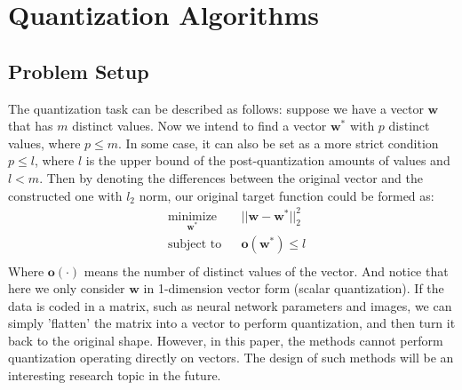 \documentclass[preprint,10pt]{elsarticle}
\begin{document}
\section{Quantization Algorithms}
\subsection{Problem Setup}
The quantization task can be described as follows: suppose we have a vector $\boldsymbol{w}$ that has $m$ distinct values. Now we intend to find a vector $\boldsymbol{w}^{*}$ with $p$ distinct values, where $p \leq m$. In some case, it can also be set as a more strict condition $p \leq l$, where $l$ is the upper bound of the post-quantization amounts of values and $l<m$. Then by denoting the differences between the original vector and the constructed one with $l_2$ norm, our original target function could be formed as:\\
\begin{equation}
\label{originalOptTargetFunc}
\begin{aligned}
& \underset{\boldsymbol{w}^{*}}{\text{minimize}}
& & ||\boldsymbol{w}-\boldsymbol{w}^{*}||_{2}^{2} \\
& \text{subject to}
& & \boldsymbol{o}(\boldsymbol{w}^{*}) \leq l \\
\end{aligned}
\end{equation}
Where $\boldsymbol{o(\cdot)}$ means the number of distinct values of the vector. And notice that here we only consider $\boldsymbol{w}$ in 1-dimension vector form (scalar quantization). If the data is coded in a matrix, such as neural network parameters and images, we can simply 'flatten' the matrix into a vector to perform quantization, and then turn it back to the original shape. However, in this paper, the methods cannot perform quantization operating directly on vectors. The design of such methods will be an interesting research topic in the future.
\end{document}
